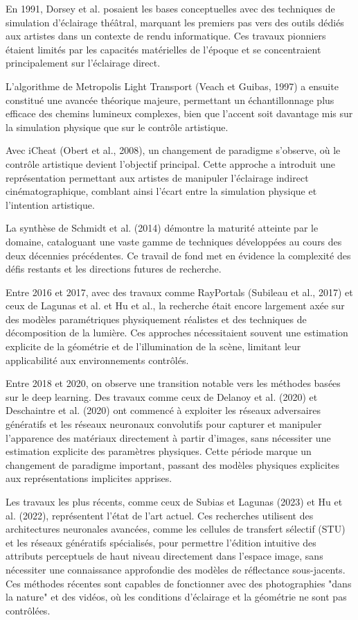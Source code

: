 \documentclass{article}
\begin{document}
En 1991, Dorsey et al. posaient les bases conceptuelles avec des techniques de simulation d'éclairage théâtral, marquant les premiers pas vers des outils dédiés aux artistes dans un contexte de rendu informatique. Ces travaux pionniers étaient limités par les capacités matérielles de l'époque et se concentraient principalement sur l'éclairage direct.

L'algorithme de Metropolis Light Transport (Veach et Guibas, 1997) a ensuite constitué une avancée théorique majeure, permettant un échantillonnage plus efficace des chemins lumineux complexes, bien que l'accent soit davantage mis sur la simulation physique que sur le contrôle artistique.

Avec iCheat (Obert et al., 2008), un changement de paradigme s'observe, où le contrôle artistique devient l'objectif principal. Cette approche a introduit une représentation permettant aux artistes de manipuler l'éclairage indirect cinématographique, comblant ainsi l'écart entre la simulation physique et l'intention artistique.

La synthèse de Schmidt et al. (2014) démontre la maturité atteinte par le domaine, cataloguant une vaste gamme de techniques développées au cours des deux décennies précédentes. Ce travail de fond met en évidence la complexité des défis restants et les directions futures de recherche.

Entre 2016 et 2017, avec des travaux comme RayPortals (Subileau et al., 2017) et ceux de Lagunas et al. et Hu et al., la recherche était encore largement axée sur des modèles paramétriques physiquement réalistes et des techniques de décomposition de la lumière. Ces approches nécessitaient souvent une estimation explicite de la géométrie et de l'illumination de la scène, limitant leur applicabilité aux environnements contrôlés.

Entre 2018 et 2020, on observe une transition notable vers les méthodes basées sur le deep learning. Des travaux comme ceux de Delanoy et al. (2020) et Deschaintre et al. (2020) ont commencé à exploiter les réseaux adversaires génératifs et les réseaux neuronaux convolutifs pour capturer et manipuler l'apparence des matériaux directement à partir d'images, sans nécessiter une estimation explicite des paramètres physiques. Cette période marque un changement de paradigme important, passant des modèles physiques explicites aux représentations implicites apprises.

Les travaux les plus récents, comme ceux de Subias et Lagunas (2023) et Hu et al. (2022), représentent l'état de l'art actuel. Ces recherches utilisent des architectures neuronales avancées, comme les cellules de transfert sélectif (STU) et les réseaux génératifs spécialisés, pour permettre l'édition intuitive des attributs perceptuels de haut niveau directement dans l'espace image, sans nécessiter une connaissance approfondie des modèles de réflectance sous-jacents. Ces méthodes récentes sont capables de fonctionner avec des photographies "dans la nature" et des vidéos, où les conditions d'éclairage et la géométrie ne sont pas contrôlées.
\end{document}
